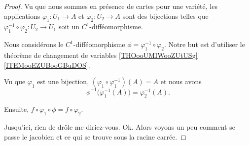 \begin{proof}
	Vu que nous sommes en présence de cartes pour une variété, les applications \( \varphi_1\colon U_1\to A\) et \( \varphi_2\colon U_2\to A\) sont des bijections telles que \( \varphi_1^{-1}\circ \varphi_2\colon U_2\to U_1\) soit un \( C^1\)-difféomorphisme.

	Nous considérons le \( C^1\)-difféomorphisme \( \phi=\varphi_1^{-1}\circ \varphi_2\). Notre but est d'utiliser le théorème de changement de variables \ref{THOooUMIWooZUtUSg}\ref{ITEMooEZUBooGBuDOS}.

	Vu que \( \varphi_1\) est une bijection, \( (\varphi_1\circ\varphi_1^{-1})(A)=A\) et nous avons
	\begin{equation}
		\phi^{-1}\big( \varphi_1^{-1}(A) \big)=\varphi_2^{-1}(A).
	\end{equation}

	Ensuite, \( f\circ\varphi_1\circ\phi=f\circ\varphi_2\).

	Jusqu'ici, rien de drôle me diriez-vous. Ok. Alors voyons un peu comment se passe le jacobien et ce qui se trouve sous la racine carrée.


\end{proof}
